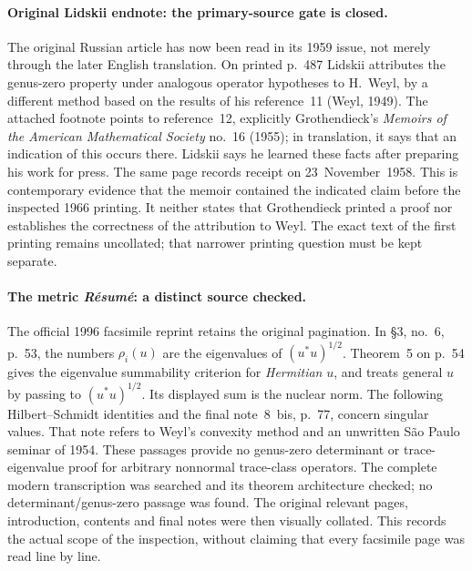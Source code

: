 \paragraph{Original Lidskii endnote: the primary-source gate is closed.}
The original Russian article has now been read in its 1959 issue,
not merely through the later English translation.
On printed p.~487 Lidskii attributes the genus-zero property under
analogous operator hypotheses to H.~Weyl, by a different method based
on the results of his reference~11 (Weyl, 1949).
The attached footnote points to reference~12, explicitly
Grothendieck's \emph{Memoirs of the American Mathematical Society}
no.~16 (1955); in translation, it says that an indication of this occurs
there. Lidskii says he learned these facts after preparing his work
for press. The same page records receipt on 23~November~1958.
\cite[p.~487, final discussion, footnote and references 11--12]{algLidskii1959}
This is contemporary evidence that the memoir contained the indicated
claim before the inspected 1966 printing. It neither states that
Grothendieck printed a proof nor establishes the correctness of the
attribution to Weyl. The exact text of the first printing remains
uncollated; that narrower printing question must be kept separate.

\paragraph{The metric \emph{R\'esum\'e}: a distinct source checked.}
The official 1996 facsimile reprint retains the original pagination.
In \S3, no.~6, p.~53, the numbers $\rho_i(u)$ are the eigenvalues
of $(u^*u)^{1/2}$. Theorem~5 on p.~54 gives the eigenvalue
summability criterion for \emph{Hermitian} $u$, and treats general
$u$ by passing to $(u^*u)^{1/2}$. Its displayed sum is the nuclear
norm. The following Hilbert--Schmidt identities and the final
note~8~bis, p.~77, concern singular values. That note refers to
Weyl's convexity method and an unwritten S\~ao Paulo seminar of 1954.
These passages provide no genus-zero determinant or trace-eigenvalue
proof for arbitrary nonnormal trace-class operators.
\cite[\S3, no.~6, pp.~53--56; final note 8~bis, p.~77]{algMetricResumeFacsimile}
The complete modern transcription was searched and its theorem
architecture checked; no determinant/genus-zero passage was found.
The original relevant pages, introduction, contents and final notes
were then visually collated. This records the actual scope of the
inspection, without claiming that every facsimile page was read line by line.
